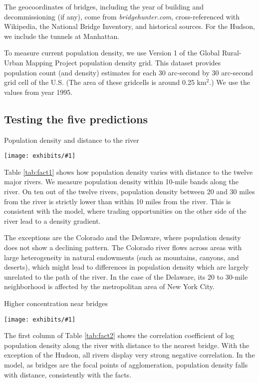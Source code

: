 \documentclass[12pt]{article}
\newcommand{\dofigure}[2]{\begin{figure}[h!]
\center %
\texttt{[image: exhibits/\#1]}
\caption{#2\label{fig:#1}}
\end{figure}}
\newcommand{\dotable}[2]{\begin{table}[h!]
\caption{#2\label{tab:#1}}
\center %
\texttt{[image: exhibits/\#1]}
\end{table}}
\begin{document}
The geocoordinates of bridges, including the year of building and decommissioning (if any), come from 
\textit{bridgehunter.com}, cross-referenced with Wikipedia, the National Bridge Inventory, and historical sources. For the Hudson, we include the tunnels at Manhattan.

To measure current population density, we use Version 1 of the Global Rural-Urban
Mapping Project population density grid. This dataset provides population
count (and density) estimates for each 30 arc-second by 30 arc-second
grid cell of the U.S. (The area of these gridcells is around 0.25 km${}^2$.) We use the values from year 1995.


\subsection{Testing the five predictions}

\dotable{fact1}{Population density and distance to the river}

Table \ref{tab:fact1} shows how population density varies with distance to
the twelve major rivers. We measure population density within 10-mile bands
along the river. On ten out of the twelve rivers, population density between
20 and 30 miles from the river is strictly lower than within 10 miles from the river. 
This is consistent with the model, where trading opportunities on the
other side of the river lead to a density gradient.

The exceptions are the Colorado and the Delaware, where population density 
does not show a declining pattern. The Colorado river flows across areas 
with large heterogeneity in natural endowments (such as mountains, canyons, 
and deserts), which might lead to differences in population density which are 
largely unrelated to the path of the river. In the case of the Delaware, its 20 
to 30-mile neighborhood is affected by the metropolitan area of New York City.

\dotable{fact2}{Higher concentration near bridges}

The first column of Table \ref{tab:fact2} shows the correlation coefficient of log population
density along the river with distance to the nearest bridge. With the
exception of the Hudson, all rivers display very strong negative
correlation. In the model, as bridges are the focal points of agglomeration,
population density falls with distance, consistently with the facts.
\end{document}
